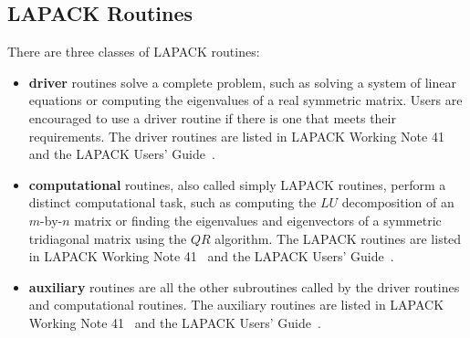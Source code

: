 \documentclass[11pt]{report}
\begin{document}
\subsection{LAPACK Routines}

There are three classes of LAPACK routines:
\begin{itemize}

\item \textbf{driver} routines solve a complete problem, such as solving
a system of linear equations or computing the eigenvalues of a real
symmetric matrix.  Users are encouraged to use a driver routine if there
is one that meets their requirements.  The driver routines are listed
in LAPACK Working Note 41~\cite{WN41} and the LAPACK Users' Guide~\cite{LUG}.

\item \textbf{computational} routines, also called simply LAPACK routines,
perform a distinct computational task, such as computing
the $LU$ decomposition of an $m$-by-$n$ matrix or finding the
eigenvalues and eigenvectors of a symmetric tridiagonal matrix using
the $QR$ algorithm.
The LAPACK routines are listed in LAPACK Working Note 41~\cite{WN41}
and the LAPACK Users' Guide~\cite{LUG}.

\item \textbf{auxiliary} routines are all the other subroutines called
by the driver routines and computational routines.
The auxiliary routines are listed in LAPACK Working Note 41~\cite{WN41}
and the LAPACK Users' Guide~\cite{LUG}.
\end{itemize}
\end{document}
